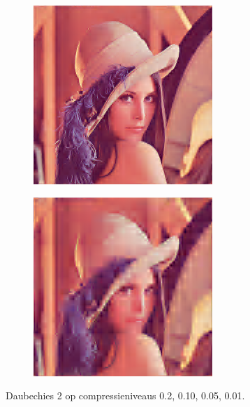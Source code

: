 \documentclass[11pt]{report}
\theoremstyle{plain}
\theoremstyle{remark}
\begin{document}
\begin{figure}
\begin{subfigure}[b]{0.24\textwidth}
	\end{subfigure}
	\begin{subfigure}[b]{0.24\textwidth}
		\centering
		\includegraphics[width=\textwidth]{plaatjes/Lenna_db2_0_05.png}
	\end{subfigure}
	\begin{subfigure}[b]{0.24\textwidth}
		\centering
		\includegraphics[width=\textwidth]{plaatjes/Lenna_db2_0_01.png}
	\end{subfigure}	
	\caption{Daubechies 2 op compressieniveaus 0.2, 0.10, 0.05, 0.01.}
\end{figure}
\end{document}
